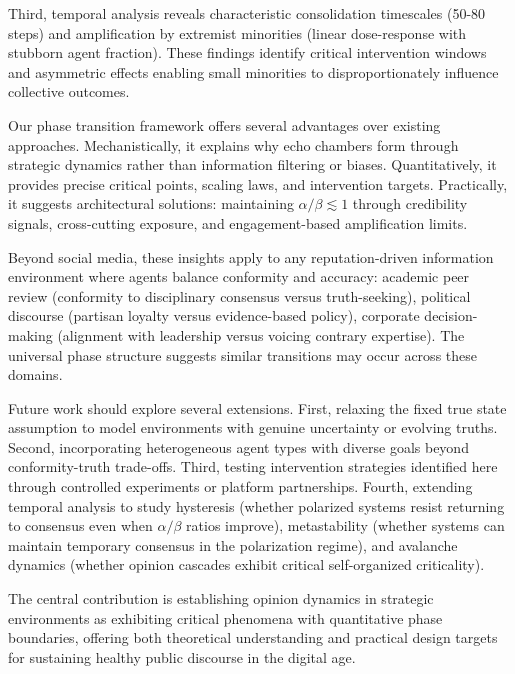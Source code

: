 \documentclass[11pt,a4paper]{article}
\begin{document}
Third, temporal analysis reveals characteristic consolidation timescales (50-80 steps) and amplification by extremist minorities (linear dose-response with stubborn agent fraction). These findings identify critical intervention windows and asymmetric effects enabling small minorities to disproportionately influence collective outcomes.

Our phase transition framework offers several advantages over existing approaches. Mechanistically, it explains why echo chambers form through strategic dynamics rather than information filtering or biases. Quantitatively, it provides precise critical points, scaling laws, and intervention targets. Practically, it suggests architectural solutions: maintaining $\alpha/\beta \lesssim 1$ through credibility signals, cross-cutting exposure, and engagement-based amplification limits.

Beyond social media, these insights apply to any reputation-driven information environment where agents balance conformity and accuracy: academic peer review (conformity to disciplinary consensus versus truth-seeking), political discourse (partisan loyalty versus evidence-based policy), corporate decision-making (alignment with leadership versus voicing contrary expertise). The universal phase structure suggests similar transitions may occur across these domains.

Future work should explore several extensions. First, relaxing the fixed true state assumption to model environments with genuine uncertainty or evolving truths. Second, incorporating heterogeneous agent types with diverse goals beyond conformity-truth trade-offs. Third, testing intervention strategies identified here through controlled experiments or platform partnerships. Fourth, extending temporal analysis to study hysteresis (whether polarized systems resist returning to consensus even when $\alpha/\beta$ ratios improve), metastability (whether systems can maintain temporary consensus in the polarization regime), and avalanche dynamics (whether opinion cascades exhibit critical self-organized criticality).

The central contribution is establishing opinion dynamics in strategic environments as exhibiting critical phenomena with quantitative phase boundaries, offering both theoretical understanding and practical design targets for sustaining healthy public discourse in the digital age.
\end{document}

